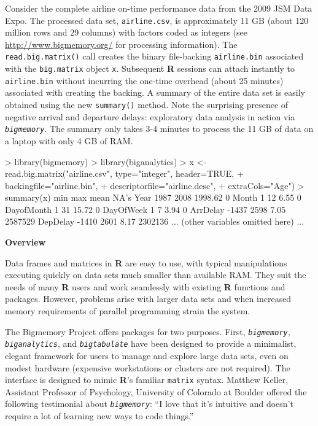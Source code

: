 \documentclass[12pt]{article}
\newcommand{\proglang}[1]{\textbf{#1}}
\newcommand{\pkg}[1]{\texttt{\textsl{#1}}}
\newcommand{\code}[1]{\texttt{#1}}
\begin{document}
Consider the complete airline on-time performance data
from the 2009 JSM Data Expo.  The processed data set, \texttt{airline.csv},
is approximately 11 GB (about 120 million rows and 29 columns)
with factors coded as integers (see \url{http://www.bigmemory.org/} for
processing information).
The \texttt{read.big.matrix()} call creates the binary
file-backing \texttt{airline.bin}
associated with the \texttt{big.matrix} object \texttt{x}.
Subsequent \proglang{R} sessions can attach instantly to \texttt{airline.bin}
without incurring the one-time overhead (about 25 minutes)
associated with creating the backing.  
A summary of the entire data set is easily obtained using the new
\texttt{summary()} method.  Note the surprising
presence of negative arrival and departure delays: exploratory data analysis
in action via \pkg{bigmemory}.  The summary
only takes 3-4 minutes to process the 11 GB of data on a laptop with only
4 GB of RAM.
\begin{Schunk}
\begin{Sinput}
> library(bigmemory)
> library(biganalytics)
> x <- read.big.matrix("airline.csv", type="integer", header=TRUE, 
+                      backingfile="airline.bin",
+                      descriptorfile="airline.desc",
+                      extraCols="Age")
> summary(x)
                          min        max        mean        NA's
Year                     1987       2008     1998.62           0
Month                       1         12        6.55           0
DayofMonth                  1         31       15.72           0
DayOfWeek                   1          7        3.94           0
ArrDelay                -1437       2598        7.05     2587529
DepDelay                -1410       2601        8.17     2302136
... (other variables omitted here) ...
\end{Sinput}
\end{Schunk}


\noindent
{\bf Overview}
\vspace*{0.5cm}

Data frames and matrices in \proglang{R} are easy to use,
with typical manipulations executing quickly on
data sets much smaller than available RAM.  They suit the needs of many
\proglang{R} users and work seamlessly with existing \proglang{R} functions
and packages.  However, problems arise with larger data sets and when
increased memory requirements of parallel programming strain the system.

The Bigmemory Project offers packages
for two purposes.  First, \pkg{bigmemory}, \pkg{biganalytics}, and
\pkg{bigtabulate} have been designed to provide a minimalist,
elegant framework for users to manage and explore large data sets, even
on modest hardware (expensive workstations or clusters are not required).
The interface is designed to mimic \proglang{R}'s familiar \code{matrix}
syntax.  Matthew Keller, Assistant Professor of
Psychology, University of Colorado at Boulder offered the following
testimonial about \pkg{bigmemory}: ``I love that it's intuitive and
doesn't require a lot of learning new ways to code things.''
\end{document}
